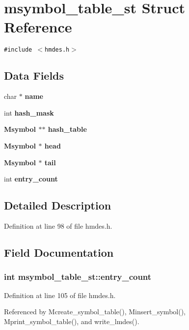 \section{msymbol\_\-table\_\-st Struct Reference}
\label{structmsymbol__table__st}
{\tt \#include $<$hmdes.h$>$}

\subsection*{Data Fields}
\begin{CompactItemize}
\item 
char $\ast$ \bf{name}
\item 
int \bf{hash\_\-mask}
\item 
\bf{Msymbol} $\ast$$\ast$ \bf{hash\_\-table}
\item 
\bf{Msymbol} $\ast$ \bf{head}
\item 
\bf{Msymbol} $\ast$ \bf{tail}
\item 
int \bf{entry\_\-count}
\end{CompactItemize}


\subsection{Detailed Description}




Definition at line 98 of file hmdes.h.

\subsection{Field Documentation}
\subsubsection{\setlength{\rightskip}{0pt plus 5cm}int \bf{msymbol\_\-table\_\-st::entry\_\-count}}\label{structmsymbol__table__st_bac5d80d09b6598b64be0b57276b491a}




Definition at line 105 of file hmdes.h.

Referenced by Mcreate\_\-symbol\_\-table(), Minsert\_\-symbol(), Mprint\_\-symbol\_\-table(), and write\_\-lmdes().
